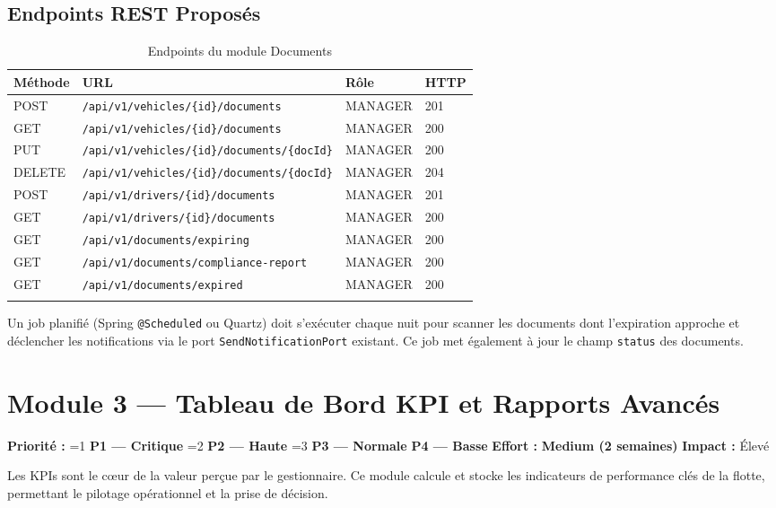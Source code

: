 \documentclass[12pt,a4paper]{report}
\newcommand{\prio}[1]{%
  \ifnum#1=1 \textcolor{fleeterror}{\textbf{P1 — Critique}}%
  \else\ifnum#1=2 \textcolor{fleetwarning}{\textbf{P2 — Haute}}%
  \else\ifnum#1=3 \textcolor{fleetsuccess}{\textbf{P3 — Normale}}%
  \else \textcolor{fleetgray}{\textbf{P4 — Basse}}%
  \fi\fi\fi}
\newcommand{\effort}[1]{\textcolor{fleetpurple}{\textbf{#1}}}
\begin{document}
\section{Endpoints REST Proposés}

\begin{longtable}{p{1.5cm}p{7cm}p{2.5cm}p{1.5cm}}
\toprule
\textbf{Méthode} & \textbf{URL} & \textbf{Rôle} & \textbf{HTTP} \\
\midrule
\endhead
POST & \texttt{/api/v1/vehicles/\{id\}/documents} & MANAGER & 201 \\
GET & \texttt{/api/v1/vehicles/\{id\}/documents} & MANAGER & 200 \\
PUT & \texttt{/api/v1/vehicles/\{id\}/documents/\{docId\}} & MANAGER & 200 \\
DELETE & \texttt{/api/v1/vehicles/\{id\}/documents/\{docId\}} & MANAGER & 204 \\
POST & \texttt{/api/v1/drivers/\{id\}/documents} & MANAGER & 201 \\
GET & \texttt{/api/v1/drivers/\{id\}/documents} & MANAGER & 200 \\
GET & \texttt{/api/v1/documents/expiring} & MANAGER & 200 \\
GET & \texttt{/api/v1/documents/compliance-report} & MANAGER & 200 \\
GET & \texttt{/api/v1/documents/expired} & MANAGER & 200 \\
\bottomrule
\caption{Endpoints du module Documents}
\end{longtable}

\begin{notebox}
Un job planifié (Spring \texttt{@Scheduled} ou Quartz) doit s'exécuter chaque nuit pour scanner les documents dont l'expiration approche et déclencher les notifications via le port \texttt{SendNotificationPort} existant. Ce job met également à jour le champ \texttt{status} des documents.
\end{notebox}

\chapter{Module 3 — Tableau de Bord KPI et Rapports Avancés}

\begin{tcolorbox}[colback=fleetsuccess!5, colframe=fleetsuccess, title={\bfseries Résumé du Module}, fonttitle=\color{white}]
\textbf{Priorité :} \prio{1} \quad \textbf{Effort :} \effort{Medium (2 semaines)} \quad \textbf{Impact :} Élevé

Les KPIs sont le cœur de la valeur perçue par le gestionnaire. Ce module calcule et stocke les indicateurs de performance clés de la flotte, permettant le pilotage opérationnel et la prise de décision.
\end{tcolorbox}
\end{document}
